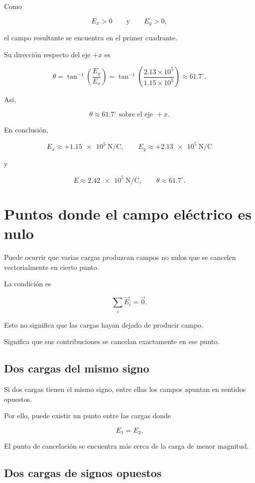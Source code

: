 Como

\[
E_x>0
\qquad\text{y}\qquad
E_y>0,
\]

el campo resultante se encuentra en el primer cuadrante.

Su dirección respecto del eje \(+x\) es

\[
\theta=\tan^{-1}\left(\frac{E_y}{E_x}\right)
=\tan^{-1}\left(\frac{2.13\times10^5}{1.15\times10^5}\right)
\approx61.7^\circ.
\]

Así,

\[
\boxed{\theta\approx61.7^\circ\text{ sobre el eje }+x}.
\]

En conclusión,

\[
\boxed{
E_x\approx+\SI{1.15e5}{\newton\per\coulomb},\qquad
E_y\approx+\SI{2.13e5}{\newton\per\coulomb}
}
\]

y

\[
\boxed{
E\approx\SI{2.42e5}{\newton\per\coulomb},
\qquad
\theta\approx61.7^\circ
}.
\]

\section{Puntos donde el campo eléctrico es nulo}

Puede ocurrir que varias cargas produzcan campos no nulos que se cancelen
vectorialmente en cierto punto.

La condición es

\[
\boxed{\sum_i\vec E_i=\vec 0}.
\]

Esto no significa que las cargas hayan dejado de producir campo.

Significa que sus contribuciones se cancelan exactamente en ese punto.


\subsection{Dos cargas del mismo signo}

Si dos cargas tienen el mismo signo, entre ellas los campos apuntan en sentidos
opuestos.

Por ello, puede existir un punto entre las cargas donde

\[
E_1=E_2.
\]

El punto de cancelación se encuentra más cerca de la carga de menor magnitud.


\subsection{Dos cargas de signos opuestos}

